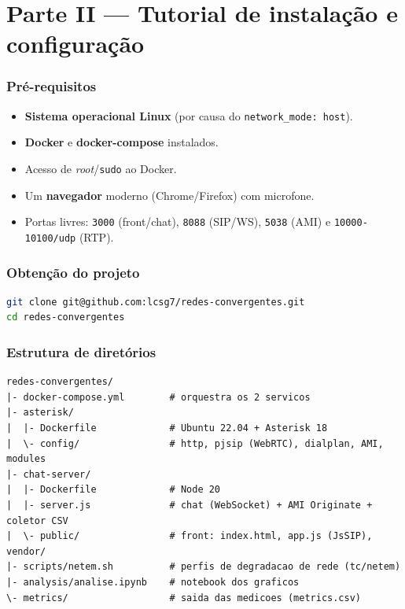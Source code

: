 \documentclass[11pt,a4paper]{article}
\begin{document}
\part*{Parte II --- Tutorial de instalação e configuração}

\section{Pré-requisitos}

\begin{itemize}[nosep]
  \item \textbf{Sistema operacional Linux} (por causa do \verb|network_mode: host|).
  \item \textbf{Docker} e \textbf{docker-compose} instalados.
  \item Acesso de \emph{root}/\verb|sudo| ao Docker.
  \item Um \textbf{navegador} moderno (Chrome/Firefox) com microfone.
  \item Portas livres: \verb|3000| (front/chat), \verb|8088| (SIP/WS), \verb|5038| (AMI) e
  \verb|10000-10100/udp| (RTP).
\end{itemize}

\section{Obtenção do projeto}

\begin{lstlisting}[language=bash]
git clone git@github.com:lcsg7/redes-convergentes.git
cd redes-convergentes
\end{lstlisting}

\section{Estrutura de diretórios}

\begin{lstlisting}
redes-convergentes/
|- docker-compose.yml        # orquestra os 2 servicos
|- asterisk/
|  |- Dockerfile             # Ubuntu 22.04 + Asterisk 18
|  \- config/                # http, pjsip (WebRTC), dialplan, AMI, modules
|- chat-server/
|  |- Dockerfile             # Node 20
|  |- server.js              # chat (WebSocket) + AMI Originate + coletor CSV
|  \- public/                # front: index.html, app.js (JsSIP), vendor/
|- scripts/netem.sh          # perfis de degradacao de rede (tc/netem)
|- analysis/analise.ipynb    # notebook dos graficos
\- metrics/                  # saida das medicoes (metrics.csv)
\end{lstlisting}
\end{document}
